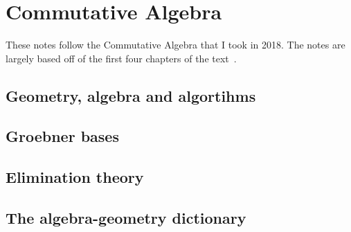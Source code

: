 \chapter{Commutative Algebra}\label{cha:commutative-algebra}
These notes follow the Commutative Algebra that I took in 2018. The notes are largely based off of the first four chapters of the text~\cite{cox_little_oshea}.

\section{Geometry, algebra and algortihms}

\section{Groebner bases}

\section{Elimination theory}

\section{The algebra-geometry dictionary}

